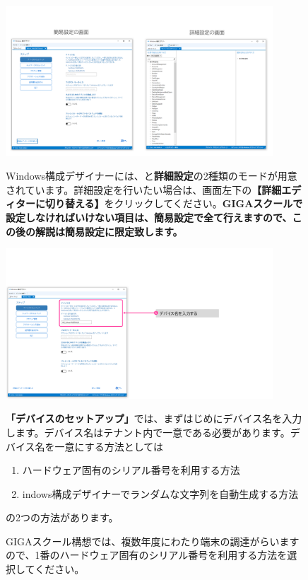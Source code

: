 \begin{figure}[hp]
    \begin{minipage}{0.6\textwidth}
        \vspace{-0.5cm}
        \includegraphics[width=10cm]{figures/MakeProvisioningPackage-04}
    \end{minipage}
    \begin{minipage}{0.4\textwidth}
        Windows構成デザイナーには、と\textbf{詳細設定}の2種類のモードが用意されています。詳細設定を行いたい場合は、画面左下の\textbf{【詳細エディターに切り替える】}をクリックしてください。\textbf{GIGAスクールで設定しなければいけない項目は、簡易設定で全て行えますので、この後の解説は簡易設定に限定致します。}
    \end{minipage}
\end{figure}

\begin{figure}[hp]
    \begin{minipage}{0.6\textwidth}
        \vspace{-2.5cm}
        \includegraphics[width=10cm]{figures/MakeProvisioningPackage-05}
    \end{minipage}
    \begin{minipage}{0.4\textwidth}
        \textbf{「デバイスのセットアップ」}では、まずはじめにデバイス名を入力します。デバイス名はテナント内で一意である必要があります。デバイス名を一意にする方法としては 
        \begin{enumerate}
            \item ハードウェア固有のシリアル番号を利用する方法
            \item indows構成デザイナーでランダムな文字列を自動生成する方法
        \end{enumerate}
        の2つの方法があります。

        GIGAスクール構想では、複数年度にわたり端末の調達がらいますので、1番のハードウェア固有のシリアル番号を利用する方法を選択してください。
    \end{minipage}
\end{figure}

